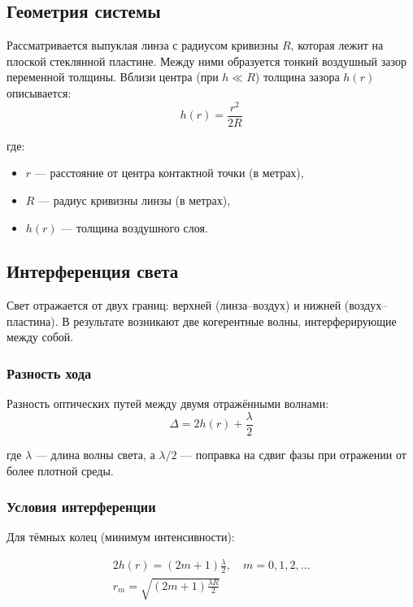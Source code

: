 \documentclass[a4paper,11pt]{article}
\theoremstyle{definition}
\begin{document}
    \subsection{Геометрия системы}
    Рассматривается выпуклая линза с радиусом кривизны \( R \), которая лежит
    на плоской стеклянной пластине. Между ними образуется тонкий воздушный зазор переменной
    толщины. Вблизи центра (при \( h \ll R \)) толщина зазора \( h(r) \) описывается:
    \begin{equation}
        h(r) = \frac{r^2}{2R}\label{eq:equation}
    \end{equation}

    где:
    \begin{itemize}
        \item \( r \) — расстояние от центра контактной точки (в метрах),
        \item \( R \) — радиус кривизны линзы (в метрах),
        \item \( h(r) \) — толщина воздушного слоя.
    \end{itemize}

    \subsection{Интерференция света}
    Свет отражается от двух границ: верхней (линза–воздух) и нижней (воздух–пластина).
    В результате возникают две когерентные волны, интерферирующие между собой.

    \subsubsection{Разность хода}
    Разность оптических путей между двумя отражёнными волнами:
    \begin{equation}
        \Delta = 2h(r) + \frac{\lambda}{2}\label{eq:equation2}
    \end{equation}

    где \( \lambda \) — длина волны света, а \( \lambda/2 \) — поправка на сдвиг фазы при отражении от более плотной среды.

    \subsubsection{Условия интерференции}

    Для тёмных колец (минимум интенсивности):

    \begin{gather}
        2h(r) = (2m + 1)\frac{\lambda}{2}, \quad m = 0, 1, 2, \dots\\
        r_m = \sqrt{(2m + 1)\frac{\lambda R}{2}}\\
    \end{gather}
\end{document}
